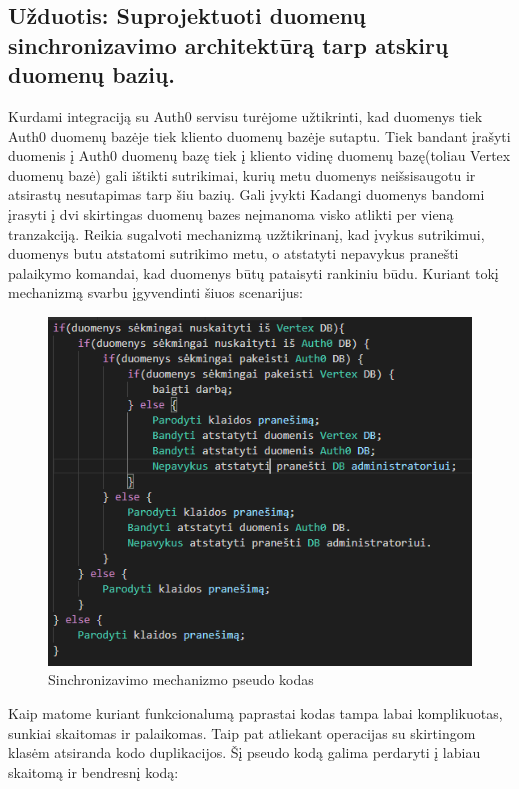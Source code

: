 \documentclass{VUMIFPSkursinis}
\begin{document}
	\subsection{Užduotis: Suprojektuoti duomenų sinchronizavimo architektūrą tarp atskirų duomenų bazių.}
		Kurdami integraciją su Auth0 servisu turėjome užtikrinti, kad duomenys tiek Auth0 duomenų bazėje tiek kliento duomenų bazėje sutaptu.
		Tiek bandant įrašyti duomenis į Auth0 duomenų bazę tiek į kliento vidinę duomenų bazę(toliau Vertex duomenų bazė) gali ištikti sutrikimai, kurių metu duomenys neišsisaugotu ir atsirastų nesutapimas tarp šiu bazių.
		Gali įvykti 
		Kadangi duomenys bandomi įrasyti į dvi skirtingas duomenų bazes neįmanoma visko atlikti per vieną tranzakciją.
		Reikia sugalvoti mechanizmą uzžtikrinanį, kad įvykus sutrikimui, duomenys butu atstatomi sutrikimo metu, o atstatyti nepavykus pranešti palaikymo komandai, kad duomenys būtų pataisyti rankiniu būdu. 
		Kuriant tokį mechanizmą svarbu įgyvendinti šiuos scenarijus:
			\begin{figure}[H]
			\includegraphics[scale=0.7]{img/five}
			\caption{Sinchronizavimo mechanizmo pseudo kodas} %
			\label{img:kurimoProcesas}
			\end{figure}
		Kaip matome kuriant funkcionalumą paprastai kodas tampa labai komplikuotas, sunkiai skaitomas ir palaikomas.
		Taip pat atliekant operacijas su skirtingom klasėm atsiranda kodo duplikacijos.
		Šį pseudo kodą galima perdaryti į labiau skaitomą ir bendresnį kodą:
\end{document}
